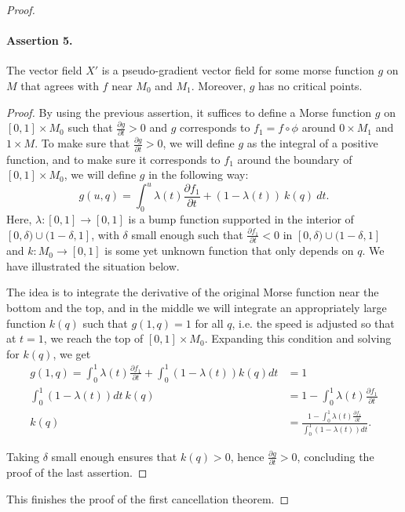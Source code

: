 \begin{proof}
\paragraph{Assertion 5.}
The vector field $X'$ is a pseudo-gradient vector field for some morse function  $g$ on $M$ that agrees with $f$ near  $M_0$ and $M_1$.
Moreover, $g$ has no critical points.
\begin{proof}
    By using the previous assertion,
    it suffices to define a Morse function $g$ on $[0, 1] \times M_0$ such that $\frac{\partial g}{\partial t} > 0$ and $g$ corresponds to  $ f_1 = f  \circ  \phi$ around $0 \times M_1$ and $1 \times M$.
    To make sure that $\frac{\partial g}{\partial t} > 0$, we will define $g$ as the integral of a positive function,
    and to make sure it corresponds to $f_1$ around the boundary of $[0,1] \times M_0$, we will define $g$ in the following way:
     \[
         g(u, q) = \int_0^{u} \lambda(t) \frac{\partial f_1}{\partial t} + (1-\lambda(t))\: k(q) \: dt
    .\] 
    Here, $\lambda: [0,1] \to  [0,1]$ is a bump function supported in the interior of $[0, \delta) \cup (1-\delta, 1]$, with $\delta$ small enough such that $\frac{\partial f_1}{\partial t}<0$ in $[0, \delta) \cup (1-\delta, 1]$ and $k: M_0 \to [0,1]$ is some yet unknown function that only depends on $q$.
    We have illustrated the situation below.
    \begin{figure}[H]
        \centering
    \end{figure}

    The idea is to integrate the derivative of the original Morse function near the bottom and the top, and in the middle we will integrate an appropriately large function $k(q)$ such that  $g(1, q) = 1$ for all $q$, i.e. the speed is adjusted so that at $t=1$, we reach the top of $[0,1] \times M_0$.
    Expanding this condition and solving for $k(q)$, we get
     \begin{align*}
         g(1, q) = \int_{0}^{1} \lambda(t) \frac{\partial f_1}{\partial t}  + \int_{0}^{1}  (1-\lambda(t)) k(q) dt &= 1\\
          \int_{0}^{1}  (1-\lambda(t))  dt \  k(q)&= 1 - \int_{0}^{1} \lambda(t) \frac{\partial f_1}{\partial t}\\
          k(q)&= \frac{1 - \int_{0}^{1} \lambda(t) \frac{\partial f_1}{\partial t}}{\int_{0}^{1}  (1-\lambda(t))  dt}
    .\end{align*} 

    Taking $\delta$ small enough ensures that  $k(q) > 0$, hence $\frac{\partial g}{\partial t}>0$, concluding the proof of the last assertion.
\end{proof}

This finishes the proof of the first cancellation theorem.
\renewcommand{\qedsymbol}{\ensuremath{\square}}
\end{proof}

